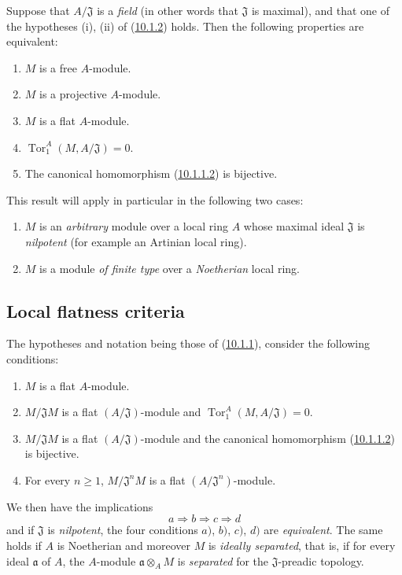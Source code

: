 \begin{env}[10.1.3]
\label{0.10.1.3}
Suppose that $A/\mathfrak{J}$ is a \emph{field} (in other words that
$\mathfrak{J}$ is maximal), and that one of the hypotheses (i), (ii) of
(\hyperref[0.10.1.2]{10.1.2}) holds. Then the following properties
are equivalent:
\begin{enumerate}
  \item[$a)$] $M$ is a free $A$-module.
  \item[$b)$] $M$ is a projective $A$-module.
  \item[$c)$] $M$ is a flat $A$-module.
  \item[$d)$] $\operatorname{Tor}_1^A(M,A/\mathfrak{J})=0$.
  \item[$e)$] The canonical homomorphism
    (\hyperref[0.10.1.1.2]{10.1.1.2}) is bijective.
\end{enumerate}
This result will apply in particular in the following two cases:
\begin{enumerate}
  \item[(i)] $M$ is an \emph{arbitrary} module over a local ring $A$ whose
    maximal ideal $\mathfrak{J}$ is \emph{nilpotent} (for example an Artinian
    local ring).
  \item[(ii)] $M$ is a module \emph{of finite type} over a
    \emph{Noetherian} local ring.
\end{enumerate}
\end{env}

\subsection{Local flatness criteria}
\label{subsection:0.10.2}

\begin{env}[10.2.1]
\label{0.10.2.1}
The hypotheses and notation being those of
(\hyperref[0.10.1.1]{10.1.1}), consider the following conditions:
\begin{enumerate}
  \item[$a)$] $M$ is a flat $A$-module.
  \item[$b)$] $M/\mathfrak{J}M$ is a flat $(A/\mathfrak{J})$-module and
    $\operatorname{Tor}_1^A(M,A/\mathfrak{J})=0$.
  \item[$c)$] $M/\mathfrak{J}M$ is a flat $(A/\mathfrak{J})$-module and
    the canonical homomorphism (\hyperref[0.10.1.1.2]{10.1.1.2}) is
    bijective.
  \item[$d)$] For every $n\geq1$, $M/\mathfrak{J}^nM$ is a flat
    $(A/\mathfrak{J}^n)$-module.
\end{enumerate}
We then have the implications
\[
  a\Rightarrow b\Rightarrow c\Rightarrow d
\]
and if $\mathfrak{J}$ is \emph{nilpotent}, the four conditions $a)$, $b)$,
$c)$, $d)$ are \emph{equivalent}. The same holds if $A$ is Noetherian
and moreover $M$ is \emph{ideally separated}, that is, if for every
ideal $\mathfrak{a}$ of $A$, the $A$-module $\mathfrak{a}\otimes_A M$ is
\emph{separated} for the $\mathfrak{J}$-preadic topology.
\end{env}

